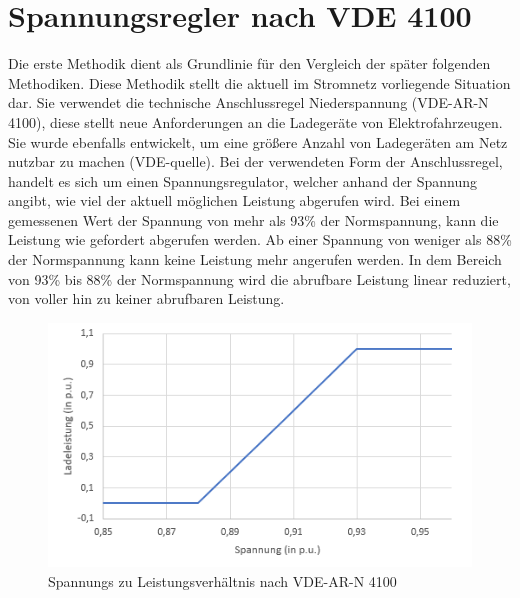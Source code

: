 \section{Spannungsregler nach VDE 4100}
\label{capBody:VDE}
Die erste Methodik dient als Grundlinie für den Vergleich der später folgenden Methodiken. Diese Methodik stellt die aktuell im Stromnetz vorliegende Situation dar. Sie verwendet die technische Anschlussregel Niederspannung (VDE-AR-N 4100), diese stellt neue Anforderungen an die Ladegeräte von Elektrofahrzeugen. Sie wurde ebenfalls entwickelt, um eine größere Anzahl von Ladegeräten am Netz nutzbar zu machen (VDE-quelle). Bei der verwendeten Form der Anschlussregel, handelt es sich um einen Spannungsregulator, welcher anhand der Spannung angibt, wie viel der aktuell möglichen Leistung abgerufen wird. Bei einem gemessenen Wert der Spannung von mehr als 93\% der Normspannung, kann die Leistung wie gefordert abgerufen werden. Ab einer Spannung von weniger als 88\% der Normspannung kann keine Leistung mehr angerufen werden. In dem Bereich von 93\% bis 88\% der Normspannung wird die abrufbare Leistung linear reduziert, von voller hin zu keiner abrufbaren Leistung.

\begin{figure}[htb]
	\includegraphics[width=\linewidth]{img/VDE3.png}
	\caption{Spannungs zu Leistungsverhältnis nach VDE-AR-N 4100}
	\label{Abb_VDEController}
\end{figure}

